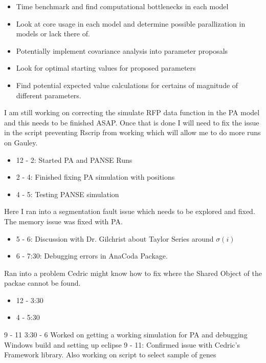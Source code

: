 \documentclass[12pt,hyperref]{labbook}
\begin{document}
\begin{itemize}
 \item Time benchmark and find computational bottlenecks in each model
 \item Look at core usage in each model and determine possible parallization in models or lack there of.
 \item Potentially implement covariance analysis into parameter proposals
 \item Look for optimal starting values for proposed parameters
 \item Find potential expected value calculations for certains of magnitude of different parameters.
\end{itemize}
I am still working on correcting the simulate RFP data function in the PA model and this needs to be finished ASAP. 
Once that is done I will need to fix the issue in the script preventing Rscrip from working which will allow me to 
do more runs on Gauley.
\begin{itemize}
    \item 12 - 2: Started PA and PANSE Runs
    \item 2 - 4: Finished fixing PA simulation with positions
    \item 4 - 5: Testing PANSE simulation
\end{itemize}
Here I ran into a segmentation fault issue which needs to be explored and fixed. The memory issue was fixed with PA.
\begin{itemize}
 \item 5 - 6: Discussion with Dr. Gilchrist about Taylor Series around $\sigma(i)$
 \item 6 - 7:30: Debugging errors in AnaCoda Package.
\end{itemize}
Ran into a problem Cedric might know how to fix where the Shared Object of the packae cannot be found.
\begin{itemize}
    \item 12 - 3:30
    \item 4 - 5:30
\end{itemize}
9 - 11
3:30 - 6
Worked on getting a working simulation for PA and debugging Windows build and setting up eclipse
9 - 11: Confirmed issue with Cedric's Framework library. Also working on script to select sample of genes
\end{document}
